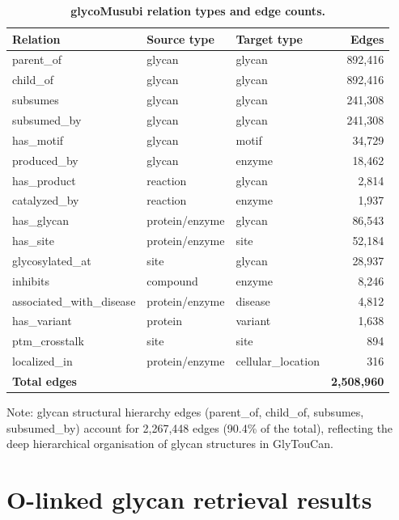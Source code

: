 \documentclass[11pt,a4paper]{article}
\begin{document}
\begin{table}[H]
\centering
\caption{\textbf{glycoMusubi relation types and edge counts.}}
\label{tab:relation_types}
\small
\begin{tabular}{lllr}
\toprule
\textbf{Relation} & \textbf{Source type} & \textbf{Target type} & \textbf{Edges} \\
\midrule
parent\_of         & glycan   & glycan   & 892,416 \\
child\_of          & glycan   & glycan   & 892,416 \\
subsumes           & glycan   & glycan   & 241,308 \\
subsumed\_by       & glycan   & glycan   & 241,308 \\
has\_motif         & glycan   & motif    & 34,729 \\
produced\_by       & glycan   & enzyme   & 18,462 \\
has\_product       & reaction & glycan   & 2,814 \\
catalyzed\_by      & reaction & enzyme   & 1,937 \\
has\_glycan        & protein/enzyme & glycan & 86,543 \\
has\_site          & protein/enzyme & site   & 52,184 \\
glycosylated\_at   & site     & glycan   & 28,937 \\
inhibits           & compound & enzyme   & 8,246 \\
associated\_with\_disease & protein/enzyme & disease & 4,812 \\
has\_variant       & protein  & variant  & 1,638 \\
ptm\_crosstalk     & site     & site     & 894 \\
localized\_in      & protein/enzyme & cellular\_location & 316 \\
\midrule
\multicolumn{3}{l}{\textbf{Total edges}} & \textbf{2,508,960} \\
\bottomrule
\end{tabular}
\end{table}

Note: glycan structural hierarchy edges (parent\_of, child\_of, subsumes,
subsumed\_by) account for 2,267,448 edges (90.4\% of the total), reflecting
the deep hierarchical organisation of glycan structures in GlyTouCan.

\section{O-linked glycan retrieval results}
\label{sec:olinked}
\end{document}

